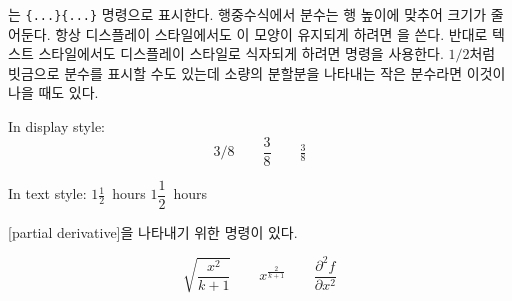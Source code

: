 는 \verb|{...}{...}| 명령으로 표시한다.
행중수식에서 분수는 행 높이에 맞추어 크기가 줄어둔다. 항상 디스플레이 스타일에서도 이 모양이 유지되게 하려면 을 쓴다.
반대로 텍스트 스타일에서도 디스플레이 스타일로 식자되게 하려면  명령을 사용한다.
$1/2$처럼 빗금으로 분수를 표시할 수도 있는데 소량의 분할분을 나타내는 작은 분수라면 이것이 나을 때도 있다.
\begin{example}
In display style:
\begin{equation*}
  3/8 \qquad \frac{3}{8} 
  \qquad \tfrac{3}{8}
\end{equation*}
\end{example}

\vspace{-.5\onelineskip}

\begin{example}
In text style:
$1\frac{1}{2}$~hours \qquad
$1\dfrac{1}{2}$~hours
\end{example}

[partial derivative]을 나타내기 위한  명령이 있다.
\begin{example}
\begin{equation*} 
  \sqrt{\frac{x^2}{k+1}}\qquad
  x^\frac{2}{k+1}\qquad
  \frac{\partial^2f}
  {\partial x^2} 
\end{equation*}
\end{example}

